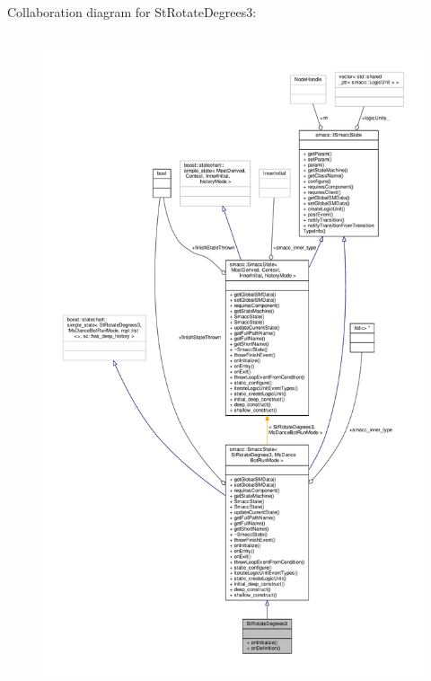 Collaboration diagram for St\+Rotate\+Degrees3\+:
\nopagebreak
\begin{figure}[H]
\begin{center}
\leavevmode
\includegraphics[height=550pt]{structStRotateDegrees3__coll__graph}
\end{center}
\end{figure}
